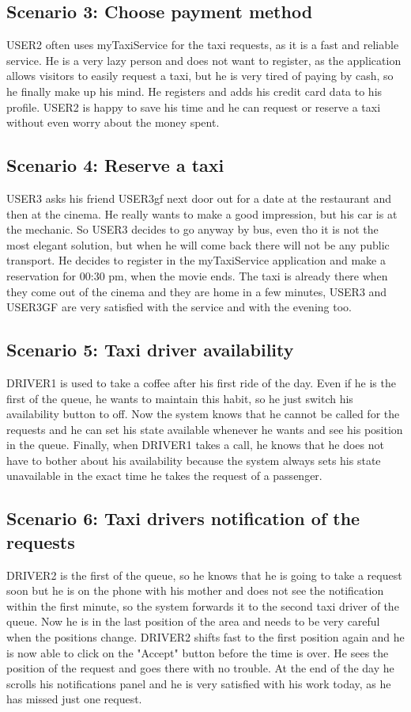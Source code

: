 \documentclass[18pt,oneside,a4paper, titlepage]{article}
\begin{document}
	\subsection{Scenario 3: Choose payment method}
		USER2 often uses myTaxiService for the taxi requests, as it is a fast and reliable service. He is a very lazy person and does not want to register, as the application allows visitors to easily request a taxi, but he is very tired of paying by cash, so he finally make up his mind. He registers and adds his credit card data to his profile. USER2 is happy to save his time and he can request or reserve a taxi without even worry about the money spent.
	
	\subsection{Scenario 4: Reserve a taxi}
		USER3 asks his friend USER3gf next door out for a date at the restaurant and then at the cinema. He really wants to make a good impression, but his car is at the mechanic. So USER3 decides to go anyway by bus, even tho it is not the most elegant solution, but when he will come back there will not be any public transport. He decides to register in the myTaxiService application and make a reservation for 00:30 pm, when the movie ends. The taxi is already there when they come out of the cinema and they are home in a few minutes, USER3 and USER3GF are very satisfied with the service and with the evening too.
		
	\subsection{Scenario 5: Taxi driver availability}
		DRIVER1 is used to take a coffee after his first ride of the day. Even if he is the first of the queue, he wants to maintain this habit, so he just switch his availability button to off. Now the system knows that he cannot be called for the requests and he can set his state available whenever he wants and see his position in the queue. Finally, when DRIVER1 takes a call, he knows that he does not have to bother about his availability because the system always sets his state unavailable in the exact time he takes the request of a passenger.
		
	\subsection{Scenario 6: Taxi drivers notification of the requests}
		DRIVER2 is the first of the queue, so he knows that he is going to take a request soon but he is on the phone with his mother and does not see the notification within the first minute, so the system forwards it to the second taxi driver of the queue. Now he is in the last position of the area and needs to be very careful when the positions change. DRIVER2 shifts fast to the first position again and he is now able to click on the "Accept" button before the time is over. He sees the position of the request and goes there with no trouble. At the end of the day he scrolls his notifications panel and he is very satisfied with his work today, as he has missed just one request.
\newpage
\end{document}
